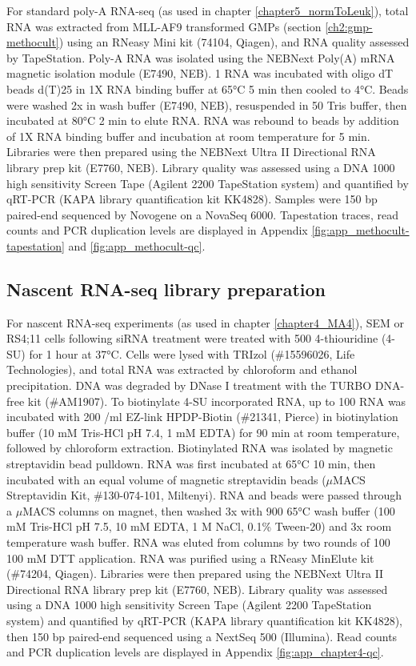 For standard poly-A RNA-seq (as used in chapter \ref{chapter5_normToLeuk}), total RNA was extracted from  MLL-AF9 transformed GMPs (section \ref{ch2:gmp-methocult}) using an RNeasy Mini kit (74104, Qiagen), and RNA quality assessed by TapeStation. Poly-A RNA was isolated using the NEBNext Poly(A) mRNA magnetic isolation module (E7490, NEB). 1 \microg{} RNA was incubated with oligo dT beads d(T)25 in 1X RNA binding buffer at 65°C 5 min then cooled to 4°C. Beads were washed 2x in wash buffer (E7490, NEB), resuspended in 50 \microl{} Tris buffer, then incubated at 80°C 2 min to elute RNA. RNA was rebound to beads by addition of 1X RNA binding buffer and incubation at room temperature for 5 min. Libraries were then prepared using the NEBNext Ultra II Directional RNA library prep kit (E7760, NEB). Library quality was assessed using a DNA 1000 high sensitivity Screen Tape (Agilent 2200 TapeStation system) and quantified by qRT-PCR (KAPA library quantification kit KK4828). Samples were 150 bp paired-end sequenced by Novogene on a NovaSeq 6000. Tapestation traces, read counts and PCR duplication levels are displayed in Appendix \ref{fig:app_methocult-tapestation} and \ref{fig:app_methocult-qc}.

\subsection{\label{ch2:rna-nascent}Nascent RNA-seq library preparation}

For nascent RNA-seq experiments (as used in chapter \ref{chapter4_MA4}),  SEM or RS4;11 cells following siRNA treatment were treated with 500 \microm{} 4-thiouridine (4-SU) for 1 hour at 37°C. Cells were lysed with TRIzol (\#15596026, Life Technologies), and total RNA was extracted by chloroform and ethanol precipitation. DNA was degraded by DNase I treatment with the TURBO DNA-free kit (\#AM1907). To biotinylate 4-SU incorporated RNA, up to 100 \microg{} RNA was incubated with 200 \microg{}/ml EZ-link HPDP-Biotin (\#21341, Pierce) in biotinylation buffer (10 mM Tris-HCl pH 7.4, 1 mM EDTA) for 90 min at room temperature, followed by chloroform extraction. Biotinylated RNA was isolated by magnetic streptavidin bead pulldown. RNA was first incubated at 65°C 10 min, then incubated with an equal volume of magnetic streptavidin beads ($\mu$MACS Streptavidin Kit, \#130-074-101, Miltenyi). RNA and beads were passed through a $\mu$MACS columns on magnet, then washed 3x with 900 \microl{} 65°C wash buffer (100 mM Tris-HCl pH 7.5, 10 mM EDTA, 1 M NaCl, 0.1\% Tween-20) and 3x room temperature wash buffer. RNA was eluted from columns by two rounds of 100 \microl{} 100 mM DTT application. RNA was purified using a RNeasy MinElute kit (\#74204, Qiagen). Libraries were then prepared using the NEBNext Ultra II Directional RNA library prep kit (E7760, NEB). Library quality was assessed using a DNA 1000 high sensitivity Screen Tape (Agilent 2200 TapeStation system) and quantified by qRT-PCR (KAPA library quantification kit KK4828), then 150 bp paired-end sequenced using a NextSeq 500 (Illumina). Read counts and PCR duplication levels are displayed in Appendix \ref{fig:app_chapter4-qc}.


